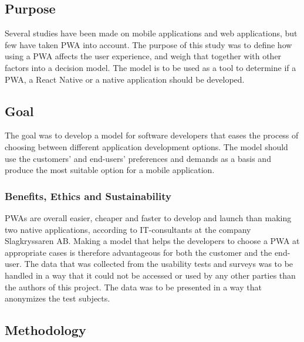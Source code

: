 \subsection{Purpose}
Several studies have been made on mobile applications and web applications, but few have taken PWA into account.
The purpose of this study was to define how using a PWA affects the user experience, and weigh that together with other factors into a decision model. The model is to be used as a tool to determine if a PWA, a React Native or a native application should be developed.


\subsection{Goal}
The goal was to develop a model for software developers that eases the process of choosing between different application development options. The model should use the customers’ and end-users’ preferences and demands as a basis and produce the most suitable option for a mobile application.



\subsubsection{Benefits, Ethics and Sustainability}
PWAs are overall easier, cheaper and faster to develop and launch than making two native applications, according to IT-consultants at the company Slagkryssaren AB. Making a model that helps the developers to choose a PWA at appropriate cases is therefore advantageous for both the customer and the end-user.
The data that was collected from the usability tests and surveys was to be handled in a way that it could not be accessed or used by any other parties than the authors of this project. The data was to be presented in a way that anonymizes the test subjects.


\subsection{Methodology}

